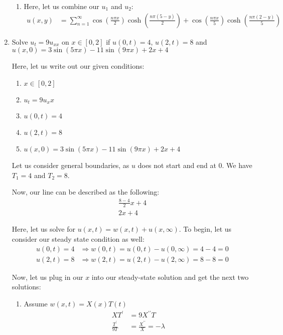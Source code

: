 \documentclass{article}
\begin{document}
\begin{enumerate}
\begin{enumerate}
  \item Here, let us combine our $u_1$ and $u_2$:
  \begin{align}
    u(x, y) & = \sum^\infty_{n = 1}
    \cos\left(\frac{n \pi x}{2}\right)\cosh\left(\frac{n \pi(5 - y)}{2}\right) +
    \cos\left(\frac{n \pi x}{5}\right)\cosh\left(\frac{n \pi(2 - y)}{5}\right)
  \end{align}
\end{enumerate}
\newpage
\setcounter{equation}{0}
  \item Solve $u_t = 9u_{xx}$ on $x \in [0, 2]$ if $u(0, t) = 4$, $u(2, t) = 8$ and $u(x, 0) = 3 \sin(5 \pi x) - 11 \sin(9 \pi x) + 2x + 4$

  Here, let us write out our given conditions:
  \begin{enumerate}
    \item $x \in [0, 2]$
    \item $u_t = 9u_xx$
    \item $u(0, t) = 4$
    \item $u(2, t) = 8$
    \item $u(x, 0) = 3\sin(5 \pi x) - 11\sin(9 \pi x) + 2x + 4$
  \end{enumerate}

  Let us consider general boundaries, as $u$ does not start and end at $0$. We have $T_1 = 4$ and $T_2 = 8$.

  Now, our line can be described as the following:
  \begin{align}
    \frac{8 - 4}{2}x + 4\\
    2x + 4
  \end{align}

  Here, let us solve for $u(x, t) = w(x, t) + u(x, \infty)$. To begin, let us consider our steady state condition as well:
  \begin{align}
    u(0, t) = 4 & \Rightarrow w(0, t) = u(0, t) - u(0, \infty) = 4 - 4 = 0\\
    u(2, t) = 8 & \Rightarrow w(2, t) = u(2, t) - u(2, \infty) = 8 - 8 = 0
  \end{align}

  Now, let us plug in our $x$ into our steady-state solution and get the next two solutions:
  \begin{enumerate}
  \item Assume $w(x, t) = X(x)T(t)$
  \begin{align}
    XT^\prime & = 9X^{\prime\prime}T\\
    \frac{T^\prime}{9T} & = \frac{X^{\prime\prime}}{X} = -\lambda
  \end{align}


\end{enumerate}
\end{enumerate}
\end{document}
